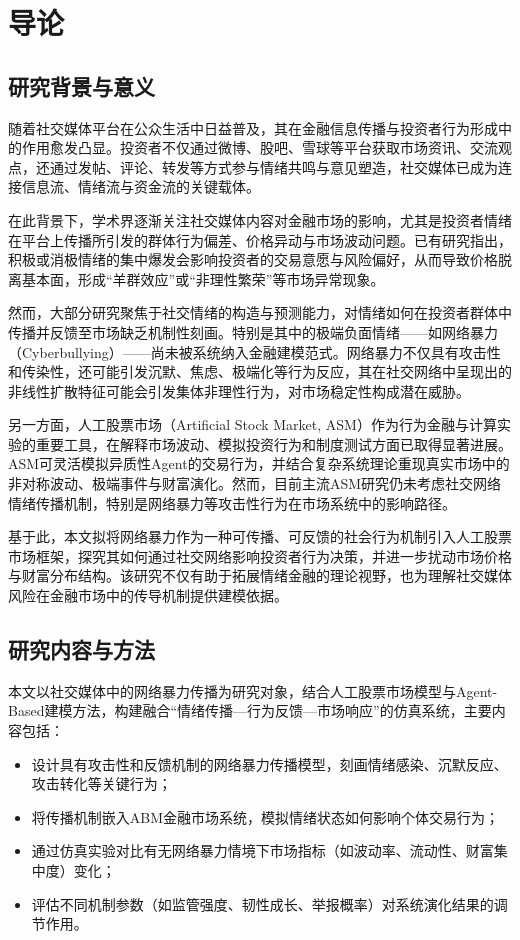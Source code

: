\chapter{导论}

\section{研究背景与意义}

随着社交媒体平台在公众生活中日益普及，其在金融信息传播与投资者行为形成中的作用愈发凸显。投资者不仅通过微博、股吧、雪球等平台获取市场资讯、交流观点，还通过发帖、评论、转发等方式参与情绪共鸣与意见塑造，社交媒体已成为连接信息流、情绪流与资金流的关键载体。

在此背景下，学术界逐渐关注社交媒体内容对金融市场的影响，尤其是投资者情绪在平台上传播所引发的群体行为偏差、价格异动与市场波动问题。已有研究指出，积极或消极情绪的集中爆发会影响投资者的交易意愿与风险偏好，从而导致价格脱离基本面，形成“羊群效应”或“非理性繁荣”等市场异常现象。

然而，大部分研究聚焦于社交情绪的构造与预测能力，对情绪如何在投资者群体中传播并反馈至市场缺乏机制性刻画。特别是其中的极端负面情绪——如网络暴力（Cyberbullying）——尚未被系统纳入金融建模范式。网络暴力不仅具有攻击性和传染性，还可能引发沉默、焦虑、极端化等行为反应，其在社交网络中呈现出的非线性扩散特征可能会引发集体非理性行为，对市场稳定性构成潜在威胁。

另一方面，人工股票市场（Artificial Stock Market, ASM）作为行为金融与计算实验的重要工具，在解释市场波动、模拟投资行为和制度测试方面已取得显著进展。ASM可灵活模拟异质性Agent的交易行为，并结合复杂系统理论重现真实市场中的非对称波动、极端事件与财富演化。然而，目前主流ASM研究仍未考虑社交网络情绪传播机制，特别是网络暴力等攻击性行为在市场系统中的影响路径。

基于此，本文拟将网络暴力作为一种可传播、可反馈的社会行为机制引入人工股票市场框架，探究其如何通过社交网络影响投资者行为决策，并进一步扰动市场价格与财富分布结构。该研究不仅有助于拓展情绪金融的理论视野，也为理解社交媒体风险在金融市场中的传导机制提供建模依据。

\section{研究内容与方法}

本文以社交媒体中的网络暴力传播为研究对象，结合人工股票市场模型与Agent-Based建模方法，构建融合“情绪传播—行为反馈—市场响应”的仿真系统，主要内容包括：

\begin{itemize}
  \item 设计具有攻击性和反馈机制的网络暴力传播模型，刻画情绪感染、沉默反应、攻击转化等关键行为；
  \item 将传播机制嵌入ABM金融市场系统，模拟情绪状态如何影响个体交易行为；
  \item 通过仿真实验对比有无网络暴力情境下市场指标（如波动率、流动性、财富集中度）变化；
  \item 评估不同机制参数（如监管强度、韧性成长、举报概率）对系统演化结果的调节作用。
\end{itemize}

